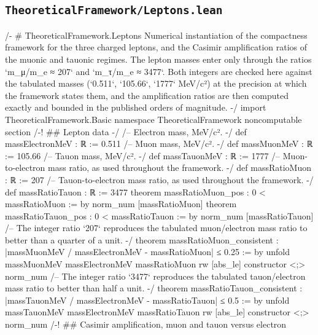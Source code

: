 \documentclass[11pt,a4paper]{article}
\begin{document}
\subsection*{\texttt{TheoreticalFramework/Leptons.lean}}
\vspace{2pt}
{\ttfamily\scriptsize\setlength{\parindent}{0pt}\setlength{\baselineskip}{7.6pt}\setlength{\parskip}{0pt}\raggedright\obeyspaces\obeylines
/-
\# TheoreticalFramework.Leptons
\mbox{}
Numerical instantiation of the compactness framework for the three charged
leptons, and the Casimir amplification ratios of the muonic and tauonic regimes.
\mbox{}
The lepton masses enter only through the ratios `m\_\allowbreak{}μ/m\_\allowbreak{}e ≈ 207` and
`m\_\allowbreak{}τ/m\_\allowbreak{}e ≈ 3477`.  Both integers are checked here against the tabulated masses
(`0.511`, `105.66`, `1777` MeV/c²) at the precision at which the framework
states them, and the amplification ratios are then computed exactly and bounded
in the published orders of magnitude.
-/
import TheoreticalFramework.Basic
\mbox{}
namespace TheoreticalFramework
\mbox{}
noncomputable section
\mbox{}
/-! \#\# Lepton data -/
\mbox{}
/-- Electron mass, MeV/c². -/
def massElectronMeV : ℝ := 0.511
\mbox{}
/-- Muon mass, MeV/c². -/
def massMuonMeV : ℝ := 105.66
\mbox{}
/-- Tauon mass, MeV/c². -/
def massTauonMeV : ℝ := 1777
\mbox{}
/-- Muon-to-electron mass ratio, as used throughout the framework. -/
def massRatioMuon : ℝ := 207
\mbox{}
/-- Tauon-to-electron mass ratio, as used throughout the framework. -/
def massRatioTauon : ℝ := 3477
\mbox{}
theorem massRatioMuon\_\allowbreak{}pos : 0 \textless{} massRatioMuon := by
  norm\_\allowbreak{}num [massRatioMuon]
\mbox{}
theorem massRatioTauon\_\allowbreak{}pos : 0 \textless{} massRatioTauon := by
  norm\_\allowbreak{}num [massRatioTauon]
\mbox{}
/-- The integer ratio `207` reproduces the tabulated muon/electron mass ratio to
better than a quarter of a unit. -/
theorem massRatioMuon\_\allowbreak{}consistent :
    |massMuonMeV / massElectronMeV - massRatioMuon| ≤ 0.25 := by
  unfold massMuonMeV massElectronMeV massRatioMuon
  rw [abs\_\allowbreak{}le]
  constructor \textless{};\textgreater{} norm\_\allowbreak{}num
\mbox{}
/-- The integer ratio `3477` reproduces the tabulated tauon/electron mass ratio
to better than half a unit. -/
theorem massRatioTauon\_\allowbreak{}consistent :
    |massTauonMeV / massElectronMeV - massRatioTauon| ≤ 0.5 := by
  unfold massTauonMeV massElectronMeV massRatioTauon
  rw [abs\_\allowbreak{}le]
  constructor \textless{};\textgreater{} norm\_\allowbreak{}num
\mbox{}
/-! \#\# Casimir amplification, muon and tauon versus electron
}
\end{document}
